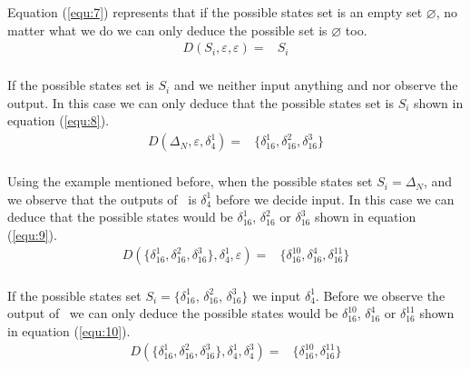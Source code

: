 Equation (\ref{equ:7}) represents that if the possible states set is an empty set $\varnothing$, no matter what we do we can only deduce the possible set is $\varnothing$ too. 
\begin{equation}
\begin{split}
D\left(S_i,\varepsilon,\varepsilon\right)=&S_i\\
\end{split}
\label{equ:8}
\end{equation}

If the possible states set is $S_i$ and we neither input anything and nor observe the output. In this case we can only deduce that the possible states set is $S_i$ shown in equation (\ref{equ:8}).
\begin{equation}
\begin{split}
D\left(\Delta_N,\varepsilon,\delta_4^1\right)=&\{\delta_{16}^1,\delta_{16}^2,\delta_{16}^3\}\\
\end{split}
\label{equ:9}
\end{equation}
 
 Using the example mentioned before, when the possible states set $S_i=\Delta_N$, and  we observe that the outputs of \BCN\ is $\delta_4^1$ before we decide input. In this case we can deduce that the possible states would be $\delta_{16}^1$, $\delta_{16}^2$ or  $\delta_{16}^3$ shown in equation (\ref{equ:9}).
\begin{equation}
\begin{split}
D\left(\{\delta_{16}^1,\delta_{16}^2,\delta_{16}^3\},\delta_4^1,\varepsilon\right)=&\{\delta_{16}^{10},\delta_{16}^4,\delta_{16}^{11}\}\\
\end{split}
\label{equ:10}
\end{equation}

If the possible states set $S_i=\{\delta_{16}^1$, $\delta_{16}^2$, $\delta_{16}^3\}$ we input $\delta_4^1$. Before we observe the output of \BCN\ we can only deduce the possible states would be   $\delta_{16}^{10}$, $\delta_{16}^4$ or  $\delta_{16}^{11}$ shown in equation (\ref{equ:10}).
\begin{equation}
\begin{split}
D\left(\{\delta_{16}^1,\delta_{16}^2,\delta_{16}^3\},\delta_4^1,\delta_4^3\right)=&\{\delta_{16}^{10},\delta_{16}^{11}\}\\
\end{split}
\label{equ:11}
\end{equation}

